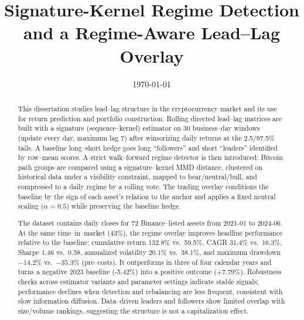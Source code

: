 \documentclass{ecsthesis}      %
\begin{document}
\frontmatter
\title      {Signature-Kernel Regime Detection and a Regime-Aware Lead–Lag Overlay}

\date       {\today}
\examiner {}

\subject    {Mathemetics}
\keywords   {}
\maketitle
\begin{abstract}

This dissertation studies lead--lag structure in the cryptocurrency market and its use for return prediction and portfolio construction. Rolling directed lead--lag matrices are built with a signature (sequence–kernel) estimator on 30 business–day windows (update every day, maximum lag 7) after winsorizing daily returns at the 2.5/97.5\% tails. A baseline long–short hedge goes long “followers” and short “leaders” identified by row–mean scores. A strict walk–forward regime detector is then introduced: Bitcoin path groups are compared using a signature–kernel MMD distance, clustered on historical data under a visibility constraint, mapped to bear/neutral/bull, and compressed to a daily regime by a rolling vote. The trading overlay conditions the baseline by the sign of each asset’s relation to the anchor and applies a fixed neutral scaling ($\alpha=0.5$) while preserving the baseline hedge.

The dataset contains daily closes for 72 Binance–listed assets from 2021-01 to 2024-06. At the same time–in–market (43\%), the regime overlay improves headline performance relative to the baseline: cumulative return 132.8\% vs.\ 59.5\%, CAGR 31.4\% vs.\ 16.3\%, Sharpe 1.46 vs.\ 0.58, annualized volatility 20.1\% vs.\ 38.1\%, and maximum drawdown $-14.2\%$ vs.\ $-35.3\%$ (pre–costs). It outperforms in three of four calendar years and turns a negative 2023 baseline (-5.42\%) into a positive outcome (+7.79\%). Robustness checks across estimator variants and parameter settings indicate stable signals; performance declines when detection and rebalancing are less frequent, consistent with slow information diffusion. Data–driven leaders and followers show limited overlap with size/volume rankings, suggesting the structure is not a capitalization effect.


\end{abstract}
\end{document}
